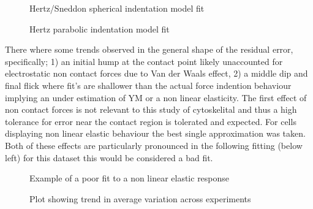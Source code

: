 \documentclass[
  paper=a4,
  ,captions=tableheading
]{scrartcl}
\makeatletter
\newcommand*\pandocbounded[1]{%
  \sbox\pandoc@box{#1}%
  \Gscale@div\@tempa{\textheight}{\dimexpr\ht\pandoc@box+\dp\pandoc@box\relax}%
  \Gscale@div\@tempb{\linewidth}{\wd\pandoc@box}%
  \ifdim\@tempb\p@<\@tempa\p@\let\@tempa\@tempb\fi%
  \ifdim\@tempa\p@<\p@\scalebox{\@tempa}{\usebox\pandoc@box}%
  \else\usebox{\pandoc@box}%
  \fi%
}
\makeatother
\begin{document}
\noindent
\begin{minipage}[t]{0.48\textwidth}
\begin{figure}
\centering
\pandocbounded{}
\caption{Hertz/Sneddon spherical indentation model fit}
\end{figure}
\end{minipage}
\hfill
\begin{minipage}[t]{0.48\textwidth}
\begin{figure}
\centering
\pandocbounded{}
\caption{Hertz parabolic indentation model fit}
\end{figure}
\end{minipage}

There where some trends observed in the general shape of the residual
error, specifically; 1) an initial hump at the contact point likely
unaccounted for electrostatic non contact forces due to Van der Waals
effect, 2) a middle dip and final flick where fit's are shallower than
the actual force indention behaviour implying an under estimation of YM
or a non linear elasticity. The first effect of non contact forces is
not relevant to this study of cytoskelital and thus a high tolerance for
error near the contact region is tolerated and expected. For cells
displaying non linear elastic behaviour the best single approximation
was taken. Both of these effects are particularly pronounced in the
following fitting (below left) for this dataset this would be considered
a bad fit.

\noindent
\begin{minipage}[t]{0.48\textwidth}
\begin{figure}
\centering
\pandocbounded{}
\caption{Example of a poor fit to a non linear elastic response}
\end{figure}
\end{minipage}
\hfill
\begin{minipage}[t]{0.48\textwidth}
\begin{figure}
\centering
\pandocbounded{}
\caption{Plot showing trend in average variation across experiments}
\end{figure}
\end{minipage}
\end{document}
